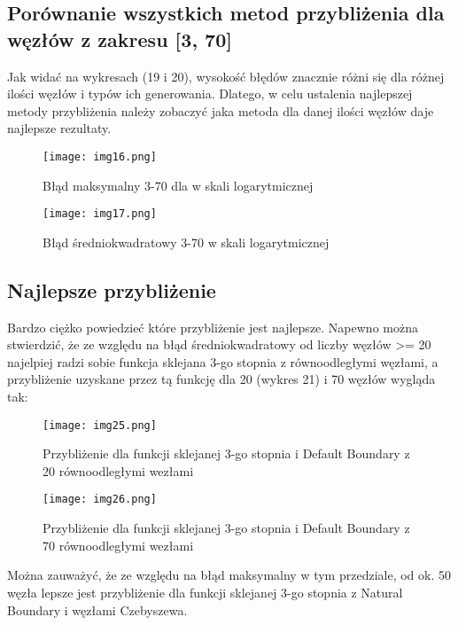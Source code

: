 \documentclass{article}
\begin{document}
\subsection{Porównanie wszystkich metod przybliżenia dla węzłów z zakresu [3, 70]}

Jak widać na wykresach (19 i 20), wysokość błędów znacznie różni się dla różnej ilości węzłów i typów ich generowania. Dlatego, w celu ustalenia najlepszej metody przybliżenia należy zobaczyć jaka metoda dla danej ilości węzłów daje najlepsze rezultaty.

\begin{figure}[H]
  \begin{minipage}[b]{0.49\textwidth}
    \texttt{[image: img16.png]}
    \caption{Błąd maksymalny 3-70 dla w skali logarytmicznej}
  \end{minipage}
  \hfill
  \begin{minipage}[b]{0.49\textwidth}
    \texttt{[image: img17.png]}
    \caption{Błąd średniokwadratowy 3-70 w skali logarytmicznej}
  \end{minipage}
\end{figure}

\subsection{Najlepsze przybliżenie}

Bardzo ciężko powiedzieć które przybliżenie jest najlepsze. Napewno można stwierdzić, że ze względu na błąd średniokwadratowy od liczby węzłów >= 20 najelpiej radzi sobie funkcja sklejana 3-go stopnia z równoodległymi węzłami, a przybliżenie uzyskane przez tą funkcję dla 20 (wykres 21) i 70 węzłów wygląda tak:

\begin{figure}[H]
  \begin{minipage}[b]{0.49\textwidth}
    \texttt{[image: img25.png]}
    \caption{Przybliżenie dla funkcji sklejanej 3-go stopnia i Default Boundary z 20 równoodległymi wezłami}
  \end{minipage}
  \hfill
  \begin{minipage}[b]{0.49\textwidth}
    \texttt{[image: img26.png]}
    \caption{Przybliżenie dla funkcji sklejanej 3-go stopnia i Default Boundary z 70 równoodległymi wezłami}
  \end{minipage}
\end{figure}

\noindent
Można zauważyć, że ze względu na błąd maksymalny w tym przedziale, od ok. 50 węzła lepsze jest przybliżenie dla funkcji sklejanej 3-go stopnia z Natural Boundary i węzłami Czebyszewa.
\end{document}
